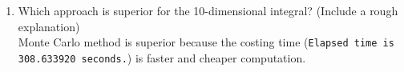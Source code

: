 \documentclass[14pt,a4paper]{article}
\begin{document}
\begin{enumerate}
\begin{lstlisting}
	\end{lstlisting}
	
	\label{4e}
	\item Which approach is superior for the 10-dimensional integral? (Include a rough explanation)\\
	Monte Carlo method is superior because the costing time (\texttt{Elapsed time is 308.633920 seconds.}) is faster and cheaper computation.\\
	
\end{enumerate}
	
	 
\end{document}

